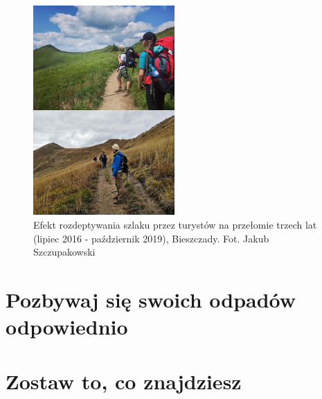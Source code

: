 \documentclass[11pt,fleqn]{book} %
\begin{document}
\begin{figure}
	\begin{center}
		\includegraphics[width=0.48\textwidth]{zasady/2/szlak}
	\end{center}
	\caption{Efekt rozdeptywania szlaku przez turystów na przełomie trzech lat (lipiec 2016 - październik 2019), Bieszczady. Fot. Jakub Szczupakowski}
\end{figure}

\lipsum


\chapter{Pozbywaj się swoich odpadów odpowiednio}
\label{rule3-trash}





\chapter{Zostaw to, co znajdziesz}
\label{rule5-leave}
\end{document}
